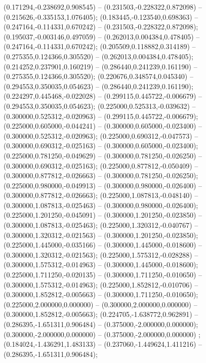  (0.171294,-0.238692,0.908545) -- (0.231503,-0.228322,0.872098) -- (0.215626,-0.335153,1.076405);
 (0.183445,-0.123540,0.698363) -- (0.247164,-0.114331,0.670242) -- (0.231503,-0.228322,0.872098);
 (0.195037,-0.003146,0.497059) -- (0.262013,0.004384,0.478405) -- (0.247164,-0.114331,0.670242);
 (0.205509,0.118882,0.314189) -- (0.275355,0.124366,0.305520) -- (0.262013,0.004384,0.478405);
 (0.214252,0.237901,0.160219) -- (0.286440,0.241239,0.161190) -- (0.275355,0.124366,0.305520);
 (0.220676,0.348574,0.045340) -- (0.294553,0.350035,0.054623) -- (0.286440,0.241239,0.161190);
 (0.224297,0.445468,-0.022028) -- (0.299115,0.445722,-0.006679) -- (0.294553,0.350035,0.054623);
 (0.225000,0.525313,-0.039632) -- (0.300000,0.525312,-0.020963) -- (0.299115,0.445722,-0.006679);
 (0.225000,0.605000,-0.044241) -- (0.300000,0.605000,-0.023400) -- (0.300000,0.525312,-0.020963);
 (0.225000,0.690312,-0.047573) -- (0.300000,0.690312,-0.025163) -- (0.300000,0.605000,-0.023400);
 (0.225000,0.781250,-0.049629) -- (0.300000,0.781250,-0.026250) -- (0.300000,0.690312,-0.025163);
 (0.225000,0.877812,-0.050409) -- (0.300000,0.877812,-0.026663) -- (0.300000,0.781250,-0.026250);
 (0.225000,0.980000,-0.049913) -- (0.300000,0.980000,-0.026400) -- (0.300000,0.877812,-0.026663);
 (0.225000,1.087813,-0.048140) -- (0.300000,1.087813,-0.025463) -- (0.300000,0.980000,-0.026400);
 (0.225000,1.201250,-0.045091) -- (0.300000,1.201250,-0.023850) -- (0.300000,1.087813,-0.025463);
 (0.225000,1.320312,-0.040767) -- (0.300000,1.320312,-0.021563) -- (0.300000,1.201250,-0.023850);
 (0.225000,1.445000,-0.035166) -- (0.300000,1.445000,-0.018600) -- (0.300000,1.320312,-0.021563);
 (0.225000,1.575312,-0.028288) -- (0.300000,1.575312,-0.014963) -- (0.300000,1.445000,-0.018600);
 (0.225000,1.711250,-0.020135) -- (0.300000,1.711250,-0.010650) -- (0.300000,1.575312,-0.014963);
 (0.225000,1.852812,-0.010706) -- (0.300000,1.852812,-0.005663) -- (0.300000,1.711250,-0.010650);
 (0.225000,2.000000,0.000000) -- (0.300000,2.000000,0.000000) -- (0.300000,1.852812,-0.005663);
 (0.224705,-1.638772,0.962891) -- (0.286395,-1.651311,0.906484) -- (0.375000,-2.000000,0.000000);
 (0.300000,-2.000000,0.000000) -- (0.375000,-2.000000,0.000000) ;
 (0.184024,-1.436291,1.483133) -- (0.237060,-1.449624,1.411216) -- (0.286395,-1.651311,0.906484);

